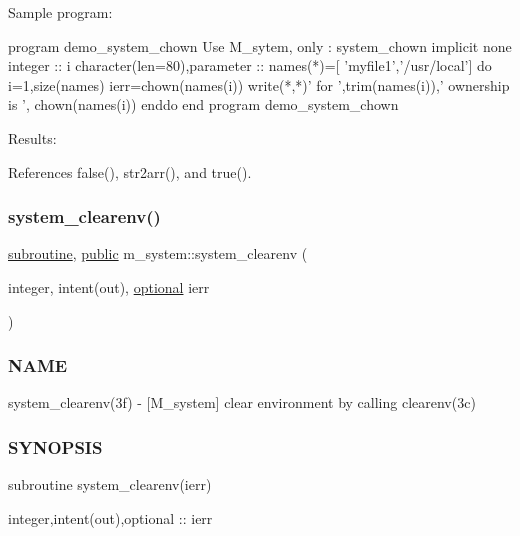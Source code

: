 \begin{DoxyVerb}    Sample program:

       program demo_system_chown
       Use M_sytem, only : system_chown
       implicit none
       integer                     :: i
       character(len=80),parameter :: names(*)=[ 'myfile1','/usr/local']
       do i=1,size(names)
          ierr=chown(names(i))
          write(*,*)' for ',trim(names(i)),' ownership is ', chown(names(i))
       enddo
       end program demo_system_chown

    Results: \end{DoxyVerb}
 

References false(), str2arr(), and true().

\mbox{\label{namespacem__system_a9c34787b170ab8d41000d7c3acb60736}} 
\subsubsection{\texorpdfstring{system\+\_\+clearenv()}{system\_clearenv()}}
{\footnotesize\ttfamily \hyperlink{M__stopwatch_83_8txt_acfbcff50169d691ff02d4a123ed70482}{subroutine}, \hyperlink{M__stopwatch_83_8txt_a2f74811300c361e53b430611a7d1769f}{public} m\+\_\+system\+::system\+\_\+clearenv (\begin{DoxyParamCaption}\item[{integer, intent(out), \hyperlink{option__stopwatch_83_8txt_aa4ece75e7acf58a4843f70fe18c3ade5}{optional}}]{ierr }\end{DoxyParamCaption})}



\subsubsection*{N\+A\+ME}

system\+\_\+clearenv(3f) -\/ \mbox{[}M\+\_\+system\mbox{]} clear environment by calling clearenv(3c) 

\subsubsection*{S\+Y\+N\+O\+P\+S\+IS}

\begin{DoxyVerb}subroutine system_clearenv(ierr)

 integer,intent(out),optional :: ierr
\end{DoxyVerb}


